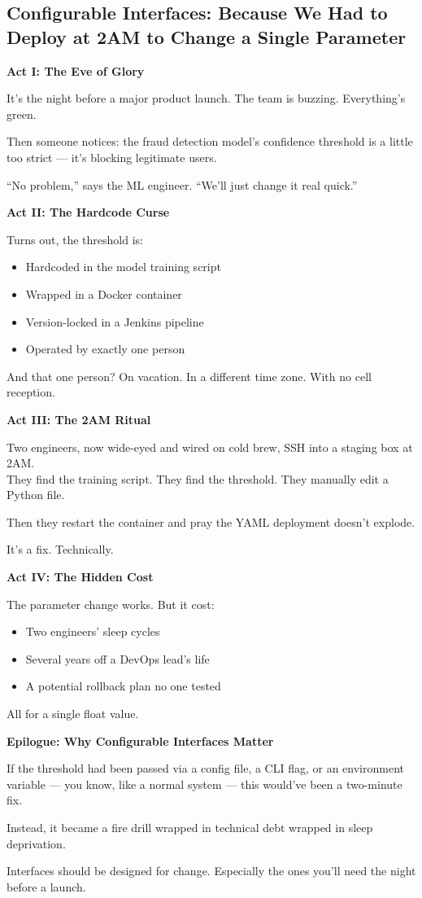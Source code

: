 \subsection{Configurable Interfaces: Because We Had to Deploy at 2AM to Change a Single Parameter}

\textbf{Act I: The Eve of Glory}

It’s the night before a major product launch. The team is buzzing. Everything’s green.

Then someone notices: the fraud detection model’s confidence threshold is a little too strict — it’s blocking legitimate users.

``No problem,'' says the ML engineer. ``We’ll just change it real quick.''

\vspace{1em}
\textbf{Act II: The Hardcode Curse}

Turns out, the threshold is:
\begin{itemize}
    \item Hardcoded in the model training script
    \item Wrapped in a Docker container
    \item Version-locked in a Jenkins pipeline
    \item Operated by exactly one person
\end{itemize}

And that one person? On vacation. In a different time zone. With no cell reception.

\vspace{1em}
\textbf{Act III: The 2AM Ritual}

Two engineers, now wide-eyed and wired on cold brew, SSH into a staging box at 2AM.\\
They find the training script. They find the threshold. They manually edit a Python file.

Then they restart the container and pray the YAML deployment doesn’t explode.

It’s a fix. Technically.

\vspace{1em}
\textbf{Act IV: The Hidden Cost}

The parameter change works. But it cost:
\begin{itemize}
    \item Two engineers’ sleep cycles
    \item Several years off a DevOps lead’s life
    \item A potential rollback plan no one tested
\end{itemize}

All for a single float value.

\vspace{1em}
\textbf{Epilogue: Why Configurable Interfaces Matter}

If the threshold had been passed via a config file, a CLI flag, or an environment variable --- you know, like a normal system --- this would’ve been a two-minute fix.

Instead, it became a fire drill wrapped in technical debt wrapped in sleep deprivation.

Interfaces should be designed for change. Especially the ones you’ll need the night before a launch.